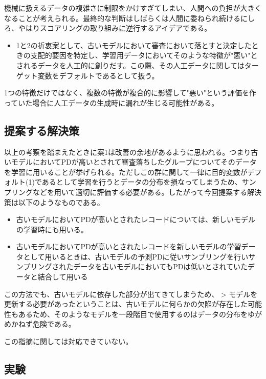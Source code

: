 \documentclass[11pt]{jsarticle}
\providecommand{\tightlist}{%
      \setlength{\itemsep}{0pt}\setlength{\parskip}{0pt}}
\begin{document}
機械に扱えるデータの複雑さに制限をかけすぎてしまい、人間への負担が大きくなることが考えられる。最終的な判断はしばらくは人間に委ねられ続けるにしろ、やはりスコアリングの取り組みに逆行するアイデアである。

\begin{itemize}
\tightlist
\item
  1と2の折衷案として、古いモデルにおいて審査において落とすと決定したときの支配的要因を特定し、学習用データにおいてそのような特徴が"悪い"とされるデータを人工的に創りだす。この際、その人工データに関してはターゲット変数をデフォルトであるとして扱う。
\end{itemize}

1つの特徴だけではなく、複数の特徴が複合的に影響して"悪い"という評価を作っていた場合に人工データの生成時に漏れが生じる可能性がある。

    \subsection{提案する解決策}\label{ux63d0ux6848ux3059ux308bux89e3ux6c7aux7b56}

    以上の考察を踏まえたときに案1は改善の余地があるように思われる。つまり古いモデルにおいてPDが高いとされて審査落ちしたグループについてそのデータを学習に用いることが挙げられる。ただしこの群に関して一律に目的変数がデフォルト(1)であるとして学習を行うとデータの分布を損なってしまうため、サンプリングなどを用いて適切に評価する必要がある。したがって今回提案する解決策は以下のようなものである。

\begin{itemize}
\tightlist
\item
  古いモデルにおいてPDが高いとされたレコードについては、新しいモデルの学習時にも用いる。
\item
  古いモデルにおいてPDが高いとされたレコードを新しいモデルの学習データとして用いるときは、古いモデルの予測PDに従いサンプリングを行いサンプリングされたデータを古いモデルにおいてもPDは低いとされていたデータと結合して用いる
\end{itemize}

この方法でも、古いモデルに依存した部分が出てきてしまうため、
\textgreater{}
モデルを更新する必要があったということは、古いモデルに何らかの欠陥が存在した可能性もあるため、そのようなモデルを一段階目で使用するのはデータの分布をゆがめかねず危険である。

この指摘に関しては対応できていない。

    \subsection{実験}\label{ux5b9fux9a13}
\end{document}
